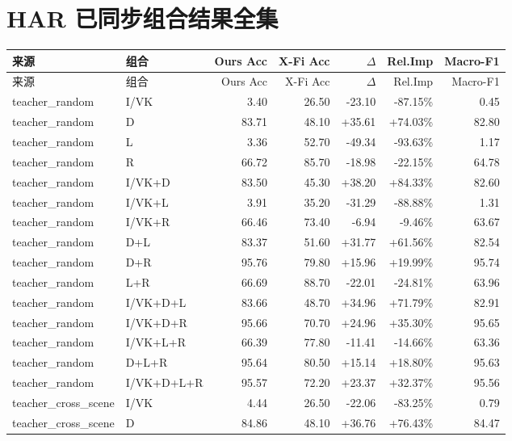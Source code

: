 \documentclass[UTF8,10pt,a4paper]{ctexart}
\newcommand{\better}[1]{\textcolor{ImpBlue}{#1}}
\newcommand{\worse}[1]{\textcolor{DropRed}{#1}}
\begin{document}
\section{HAR 已同步组合结果全集}
{\tiny
\begin{longtable}{llrrrrr}
\toprule
来源 & 组合 & Ours Acc & X-Fi Acc & $\Delta$ & Rel.Imp & Macro-F1\\
\midrule
\endfirsthead
\toprule
来源 & 组合 & Ours Acc & X-Fi Acc & $\Delta$ & Rel.Imp & Macro-F1\\
\midrule
\endhead
teacher\_random & I/VK & 3.40 & 26.50 & \worse{-23.10} & \worse{-87.15\%} & 0.45\\
teacher\_random & D & 83.71 & 48.10 & \better{+35.61} & \better{+74.03\%} & 82.80\\
teacher\_random & L & 3.36 & 52.70 & \worse{-49.34} & \worse{-93.63\%} & 1.17\\
teacher\_random & R & 66.72 & 85.70 & \worse{-18.98} & \worse{-22.15\%} & 64.78\\
teacher\_random & I/VK+D & 83.50 & 45.30 & \better{+38.20} & \better{+84.33\%} & 82.60\\
teacher\_random & I/VK+L & 3.91 & 35.20 & \worse{-31.29} & \worse{-88.88\%} & 1.31\\
teacher\_random & I/VK+R & 66.46 & 73.40 & \worse{-6.94} & \worse{-9.46\%} & 63.67\\
teacher\_random & D+L & 83.37 & 51.60 & \better{+31.77} & \better{+61.56\%} & 82.54\\
teacher\_random & D+R & 95.76 & 79.80 & \better{+15.96} & \better{+19.99\%} & 95.74\\
teacher\_random & L+R & 66.69 & 88.70 & \worse{-22.01} & \worse{-24.81\%} & 63.96\\
teacher\_random & I/VK+D+L & 83.66 & 48.70 & \better{+34.96} & \better{+71.79\%} & 82.91\\
teacher\_random & I/VK+D+R & 95.66 & 70.70 & \better{+24.96} & \better{+35.30\%} & 95.65\\
teacher\_random & I/VK+L+R & 66.39 & 77.80 & \worse{-11.41} & \worse{-14.66\%} & 63.36\\
teacher\_random & D+L+R & 95.64 & 80.50 & \better{+15.14} & \better{+18.80\%} & 95.63\\
teacher\_random & I/VK+D+L+R & 95.57 & 72.20 & \better{+23.37} & \better{+32.37\%} & 95.56\\
teacher\_cross\_scene & I/VK & 4.44 & 26.50 & \worse{-22.06} & \worse{-83.25\%} & 0.79\\
teacher\_cross\_scene & D & 84.86 & 48.10 & \better{+36.76} & \better{+76.43\%} & 84.47\\

\end{longtable}}
\end{document}

